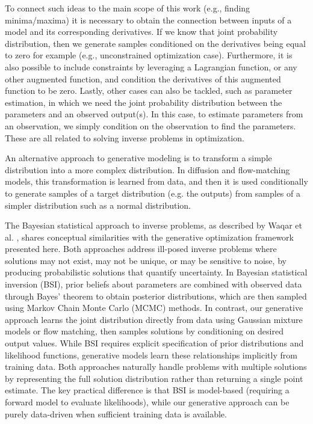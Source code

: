 \documentclass{achemso}
\begin{document}
To connect such ideas to the main scope of this work (e.g., finding minima/maxima) it is necessary to obtain the connection between inputs of a model and its corresponding derivatives. If we know that joint probability distribution, then we generate samples conditioned on the derivatives being equal to zero for example (e.g., unconstrained optimization case). Furthermore, it is also possible to include constraints by leveraging a Lagrangian function, or any other augmented function, and condition the derivatives of this augmented function to be zero. Lastly, other cases can also be tackled, such as parameter estimation, in which we need the joint probability distribution between the parameters and an observed output(s). In this case, to estimate parameters from an observation, we simply condition on the observation to find the parameters. These are all related to solving inverse problems in optimization.

An alternative approach to generative modeling is to transform a simple distribution into a more complex distribution. In diffusion and flow-matching models, this transformation is learned from data, and then it is used conditionally to generate samples of a target distribution (e.g. the outputs) from samples of a simpler distribution such as a normal distribution.

The Bayesian statistical approach to inverse problems, as described by Waqar et al. \cite{waqar-2023-tutor-bayes}, shares conceptual similarities with the generative optimization framework presented here. Both approaches address ill-posed inverse problems where solutions may not exist, may not be unique, or may be sensitive to noise, by producing probabilistic solutions that quantify uncertainty. In Bayesian statistical inversion (BSI), prior beliefs about parameters are combined with observed data through Bayes' theorem to obtain posterior distributions, which are then sampled using Markov Chain Monte Carlo (MCMC) methods. In contrast, our generative approach learns the joint distribution directly from data using Gaussian mixture models or flow matching, then samples solutions by conditioning on desired output values. While BSI requires explicit specification of prior distributions and likelihood functions, generative models learn these relationships implicitly from training data. Both approaches naturally handle problems with multiple solutions by representing the full solution distribution rather than returning a single point estimate. The key practical difference is that BSI is model-based (requiring a forward model to evaluate likelihoods), while our generative approach can be purely data-driven when sufficient training data is available.
\end{document}
